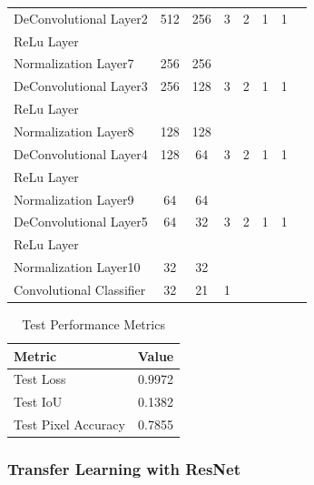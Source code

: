 \documentclass{article}
\begin{document}
\begin{table}[H]
{\begin{tabular}{lccccccc}
    DeConvolutional Layer2 & 512   & 256   & 3     & 2     & 1     & 1     &  \\
    ReLu Layer &       &       &       &       &       &       &  \\
    Normalization Layer7 & 256   & 256   &       &       &       &       &  \\
    DeConvolutional Layer3 & 256   & 128   & 3     & 2     & 1     & 1     &  \\
    ReLu Layer &       &       &       &       &       &       &  \\
    Normalization Layer8 & 128   & 128   &       &       &       &       &  \\
    DeConvolutional Layer4 & 128   & 64    & 3     & 2     & 1     & 1     &  \\
    ReLu Layer &       &       &       &       &       &       &  \\
    Normalization Layer9 & 64    & 64    &       &       &       &       &  \\
    DeConvolutional Layer5 & 64    & 32    & 3     & 2     & 1     & 1     &  \\
    ReLu Layer &       &       &       &       &       &       &  \\
    Normalization Layer10 & 32    & 32    &       &       &       &       &  \\
    Convolutional Classifier & 32    & 21    & 1     &       &       &       &  \\
    \bottomrule
    \end{tabular}%
    }
  \label{tab:custom}%
\end{table}%

\begin{table}[H]
    \centering
    \begin{tabular}{l c}
        \toprule
        \textbf{Metric} & \textbf{Value} \\
        \midrule
        Test Loss & 0.9972 \\
        Test IoU & 0.1382 \\
        Test Pixel Accuracy & 0.7855 \\
        \bottomrule
    \end{tabular}
    \caption{Test Performance Metrics}
    \label{tab:test_metrics_2}
\end{table}


\subsubsection{Transfer Learning with ResNet} 
\end{document}
